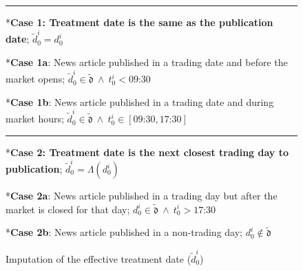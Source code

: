 \begin{figure}[H]
\caption{Imputation of the effective treatment date ($\tilde d_0^i$)}
\label{fig:trading-timelines}


\rule{\linewidth}{0.4pt}
*{\textbf{Case 1: Treatment date is the same as the publication date};  $\tilde d_0^i = d_0^i$}

\begin{minipage}{0.47\textwidth}
\centering
{}*{\textbf{Case 1a}: News article published in a trading date and before the market opens;  $\tilde d_0^i \in \tilde{\mathfrak d} ~\wedge~ t_0^i < \text{09:30}$}

\end{minipage}
\hfill
\begin{minipage}{0.46\textwidth}
\centering
{}*{\textbf{Case 1b}: News article published in a trading date and during market hours;  $\tilde d_0^i \in \tilde{\mathfrak d} ~\wedge~ t_0^i \in [\text{09:30}, \text{17:30}]$}

\end{minipage}

\vspace{0.3cm}
\rule{\linewidth}{0.4pt}

*{\textbf{Case 2: Treatment date is the next closest trading day to publication}; $\tilde d_0^i = \Lambda(d_0^i)$}  

\begin{minipage}{0.48\textwidth}
\centering
{}*{\textbf{Case 2a}: News article published in a trading day but after the market is closed for that day; $d_0^i\in \tilde{\mathfrak d} ~\wedge~ t_0^i>\text{17:30}  $}  

\end{minipage}
\hfill
\begin{minipage}{0.45\textwidth}
\centering
{}*{\textbf{Case 2b}: News article  published in a non-trading day; $d_0^i\not \in \tilde{\mathfrak d}$}  

\end{minipage}


\end{figure}
